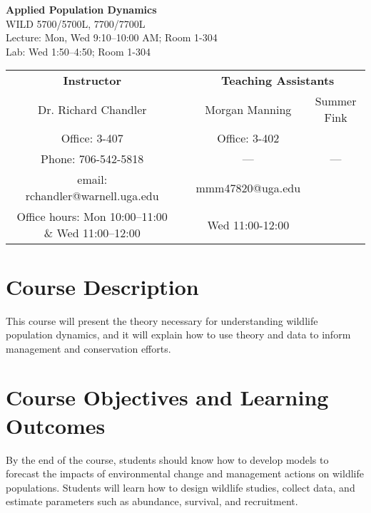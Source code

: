 \documentclass[12pt]{article}
\begin{document}

{\centering

{\Large
  \bf \sc
  Applied Population Dynamics \\}
  WILD 5700/5700L, 7700/7700L  \\
  Lecture: Mon, Wed 9:10--10:00 AM; Room 1-304 \\
  Lab: Wed 1:50--4:50; Room 1-304 \\


\normalsize

\vspace{0.5cm}

\begin{tabular}[h!]{cccc}
\textbf{Instructor}                 & \hspace{0.01cm} & \multicolumn{2}{c}{\textbf{Teaching Assistants}} \\
Dr. Richard Chandler                & & Morgan Manning & Summer Fink\\
Office: 3-407                       & & Office: 3-402  &    \\
Phone: 706-542-5818                 & & --- & --- \\
email: rchandler@warnell.uga.edu    & & mmm47820@uga.edu &   \\
Office hours: Mon 10:00--11:00 \& Wed 11:00--12:00 & & Wed 11:00-12:00 &  \\
\end{tabular}


}



\normalsize


\vspace{-2mm}
\section*{\normalsize Course Description}
\vspace{-4mm}
This course will present the theory necessary for understanding
wildlife population dynamics, and it will explain how to use theory
and data to inform management and conservation efforts.

\vspace{-2mm}
\section*{\normalsize Course Objectives and Learning Outcomes}
\vspace{-4mm}
By the end of the course, students should know how to develop models
to forecast the impacts of environmental change and management actions
on wildlife populations. Students will learn how to design wildlife studies,
collect data, and estimate parameters such as abundance,
survival, and recruitment.
\end{document}
